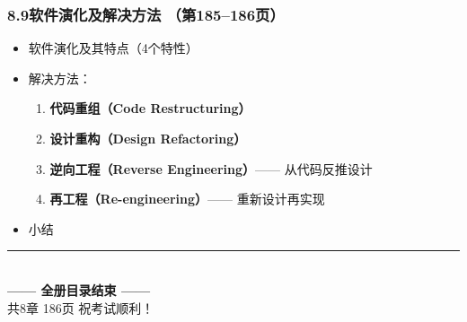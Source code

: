 \documentclass[12pt,a4paper]{ctexart}
\begin{document}
\subsubsection{8.9\quad 软件演化及解决方法 \hfill（第185--186页）}
\begin{itemize}
    \item 软件演化及其特点（4个特性）
    \item 解决方法：
    \begin{enumerate}
        \item \textbf{代码重组（Code Restructuring）}
        \item \textbf{设计重构（Design Refactoring）}
        \item \textbf{逆向工程（Reverse Engineering）}—— 从代码反推设计
        \item \textbf{再工程（Re-engineering）}—— 重新设计再实现
    \end{enumerate}
    \item 小结
\end{itemize}

\vspace{0.5cm}
\begin{center}
    \rule{\textwidth}{1pt}\\[0.3cm]
    {\large\bfseries —— 全册目录结束 ——}\\[0.3cm]
    {\normalsize 共8章 \quad 186页 \quad 祝考试顺利！}
\end{center}
\end{document}
